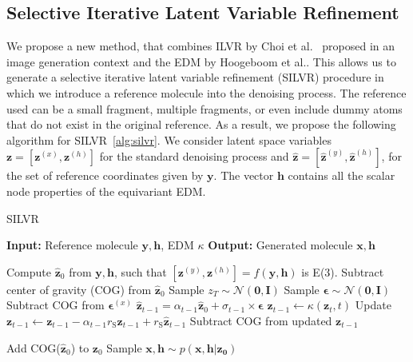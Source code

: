 \documentclass[journal=jacsat,manuscript=article]{achemso}
\begin{document}
\subsection{Selective Iterative Latent Variable Refinement}
\label{sec:silvr}
We propose a new method, that combines ILVR by Choi et al.~\cite{choi2021ilvr} proposed in an image generation context and the EDM by Hoogeboom et al.. This allows us to generate a selective iterative latent variable refinement (SILVR) procedure in which we introduce a reference molecule into the denoising process. The reference used can be a small fragment, multiple fragments, or even include dummy atoms that do not exist in the original reference. As a result, we propose the following algorithm for SILVR~\ref{alg:silvr}.  We consider latent space variables $\mathbf{z}=[\mathbf{z}^{(x)},\mathbf{z}^{(h)}]$ for the standard denoising process and  $\mathbf{\hat{z}} = [\mathbf{\hat{z}}^{(y)},\mathbf{\hat{z}}^{(h)}]$, for the set of reference coordinates given by $\mathbf{y}$. The vector $\mathbf{h}$ contains all the scalar node properties of the equivariant EDM. 
\begin{algorithm}
\caption{SILVR}\label{alg:silvr}
\begin{algorithmic}[1]
\State \textbf{Input:} Reference molecule $\mathbf{y,h}$, EDM $\kappa$ 
\State \textbf{Output:} Generated molecule $\mathbf{x,h}$

\State Compute $\mathbf{\hat{z}}_0$ from $\mathbf{y, h}$, such that $[\mathbf{z}^{(y)} , \mathbf{z}^{(h)} ] = f (\mathbf{y, h})$ is E(3). 
\State Subtract center of gravity (COG) from $\mathbf{\hat{z}}_0$
\State Sample $z_T \sim \mathcal{N}(\mathbf{0,I})$
    \State Sample $\boldsymbol{\epsilon} \sim \mathcal{N}(\mathbf{0,I})$
    \State Subtract COG from $\boldsymbol{\epsilon}^{(x)}$
    \State $\mathbf{\hat{z}}_{t-1} = \alpha_{t-1} \mathbf{\hat{z}}_{0} +\sigma_{t-1}\times\boldsymbol{\epsilon}$
    \State $\mathbf{z}_{t-1} \gets \kappa (\mathbf{z}_t,t)$
    \State Update $\mathbf{z}_{t-1} \gets \mathbf{z}_{t-1} - \alpha_{t-1}r_{\mathrm{S}} \mathbf{z}_{t-1} +r_{\mathrm{S}} \mathbf{\hat{z}}_{t-1}$ 
    \State Subtract COG from updated $\mathbf{z}_{t-1}$

\EndFor
\State Add COG($\mathbf{\hat{z}}_0$) to $\mathbf{z}_0$
\State Sample $\mathbf{x,h} \sim p(\mathbf{x,h|z_0})$ 
\end{algorithmic}
\end{algorithm}
\end{document}
